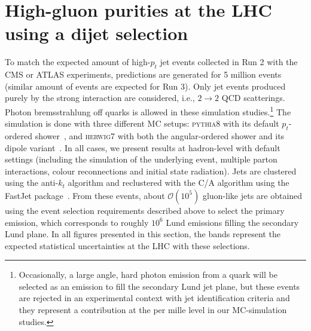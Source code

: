 \documentclass[a4paper,11pt]{article}
\newcommand{\py}{{\textsc{pythia}}8\xspace}
\newcommand{\hw}{{\textsc{herwig}}7\xspace}
\begin{document}
\section{High-gluon purities at the LHC using a dijet selection}
\label{sec:MCs}

To match the expected amount of high-$p_t$ jet events collected in Run 2 with the CMS or ATLAS experiments, predictions are generated for 5 million events (similar amount of events are expected for Run 3). Only jet events produced purely by the strong interaction are considered, i.e., $2\to 2$ QCD scatterings. Photon bremsstrahlung off quarks is allowed in these simulation studies.\footnote{Occasionally, a large angle, hard photon emission from a quark will be selected as an emission to fill the secondary Lund jet plane, but these events are rejected in an experimental context with jet identification criteria and they represent a contribution at the per mille level in our MC-simulation studies.} The simulation is done with three different MC setups: \py with its default $p_t$-ordered shower~\cite{Bierlich:2022pfr}, and \hw with both the angular-ordered shower and its dipole variant~\cite{Bellm:2019zci}. In all cases, we present results at hadron-level with default settings (including the simulation of the underlying event, multiple parton interactions, colour reconnections and initial state radiation). Jets are clustered using the anti-$k_t$ algorithm and reclustered with the C/A algorithm using the FastJet package~\cite{Cacciari:2005hq,Cacciari:2011ma}. From these events, about $\mathcal{O}(10^5)$ gluon-like jets are obtained using the event selection requirements described above to select the primary emission, which corresponds to roughly $10^6$ Lund emissions filling the secondary Lund plane. In all figures presented in this section, the bands represent the expected statistical uncertainties at the LHC with these selections.
\end{document}
